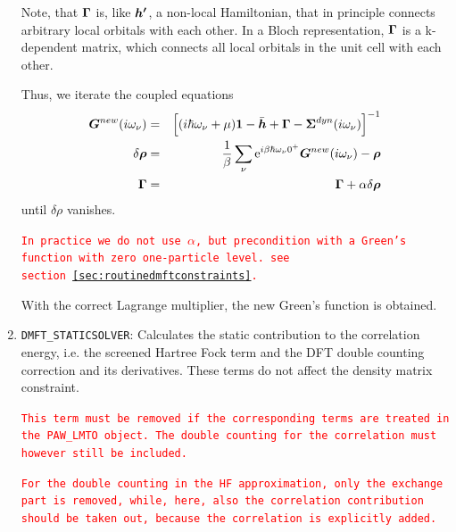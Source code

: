 \documentclass[11pt,a4paper]{report}
\newcommand{\petertt}[1]{\textcolor{red}{\texttt{#1}}}
\begin{document}
\begin{enumerate}
Note, that $\bm{\Gamma}$ is, like $\bm{h'}$, a non-local Hamiltonian,
that in principle connects arbitrary local orbitals with each
other. In a Bloch representation, $\bm{\Gamma}$ is a k-dependent matrix,
which connects all local orbitals in the unit cell with each other.

Thus, we iterate the coupled equations
\begin{eqnarray}
\bm{G}^{new}(i\omega_\nu)&=&\Bigl[(i\hbar\omega_\nu+\mu)\bm{1}
-\bar{\bm{h}}+\bm{\Gamma}
-\bm{\Sigma}^{dyn}(i\omega_\nu)
\Bigr]^{-1}
\nonumber\\
\delta\bm{\rho}&=&\frac{1}{\beta}\sum_\nu 
\mathrm{e}^{i\beta\hbar\omega_\nu0^+}\bm{G}^{new}(i\omega_\nu)-\bm{\rho}
\nonumber\\
\bm{\Gamma}&=&\bm{\Gamma}+\alpha \delta\bm{\rho}
\end{eqnarray}
until $\delta\rho$ vanishes.

\petertt{In practice we do not use $\alpha$, but precondition with a
  Green's function with zero one-particle level. see
  section~\ref{sec:routinedmftconstraints}.}

With the correct Lagrange multiplier, the new Green's function is
obtained.
%
\item \verb|DMFT_STATICSOLVER|: Calculates the static contribution to
  the correlation energy, i.e. the screened Hartree Fock term and the
  DFT double counting correction and its derivatives. These terms do
  not affect the density matrix constraint.

   \petertt{This term must be removed if the corresponding terms are
     treated in the PAW\_LMTO object. The double counting for the
     correlation must however still be included.}

    \petertt{For the double counting in the HF approximation, only the
      exchange part is removed, while, here, also the correlation
      contribution should be taken out, because the correlation is
      explicitly added.}


\end{enumerate}
\end{document}
